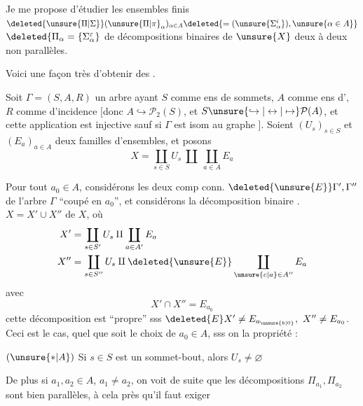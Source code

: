 Je me propose d'étudier les ensembles finis
$\deleted{\unsure{\Pi|\Sigma}}(\unsure{\Pi|\pi}_\alpha)_{\alpha\in A}
\deleted{=(\unsure{\Sigma_\alpha^i}),\unsure{\alpha\in A}}$
$\deleted{\Pi_\alpha=\{\Sigma_\alpha^\varepsilon}$
de décompositions binaires de $\unsure{X}$ deux à deux non parallèles.

Voici une façon très 
d'obtenir des .

Soit  $\Gamma=(S,A,R)$ un arbre ayant $S$ comme ens de sommets, $A$ \unsure{-} comme ens d', $R$ comme  d'incidence [donc
$A\hookrightarrow\mathcal{P}_2(S)$, et $S\unsure{\hookrightarrow|\leftrightarrow|\mapsto}\mathcal{P}(A)$, et cette application est injective sauf si $\Gamma$ est isom au graphe
\diagram{\begin{tikzcd}[ampersand replacement=\&,column sep=1.4em]
\bullet \arrow[r,dash] \& \bullet
\end{tikzcd}}
]. Soient $(U_s)_{s\in S}$ et $(E_a)_{a\in A}$ deux familles d'ensembles, et posons
\[
X=\coprod_{s\in S}U_s\ \amalg\ \coprod_{a\in A}E_a
\]

Pour tout $a_0\in A$, considérons les deux comp conn. $\deleted{\unsure{E}}\Gamma',\Gamma''$ de l'arbre $\Gamma$ ``coupé en $a_0$'', et considérons la décomposition binaire . $X=X'\cup X''$ de $X$,
où
\[
\begin{aligned}
X'&=\coprod_{s\in S'}U_s\amalg\coprod_{a\in A'}E_a\\
X''&=\coprod_{s\in S''}U_s\amalg\deleted{\unsure{E}}\coprod_{\unsure{c|a}\in A''}E_a
\end{aligned}
\]
avec
\[
X'\cap X''=E_{a_0}
\]
cette décomposition est ``propre'' sss $\deleted{E}X'\ne E_{a_{\unsure{b|0}}},\ X''\ne E_{a_0}$. Ceci est le cas, quel que soit le choix de $a_0\in A$, sss on  la propriété  :

$(\unsure{\ast|A})$ Si $s\in S$ est un sommet-bout, alors $U_s\ne\varnothing$


De plus si $a_1,a_2\in A$, $a_1\ne a_2$, on voit de suite que les décompositions $\Pi_{a_1},\Pi_{a_2}$ sont bien parallèles, à cela près qu'il faut exiger %

